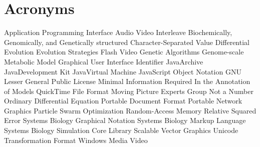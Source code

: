\chapter{Acronyms}
\begin{acronym}[SBSCL]
  \setlength{\parskip}{0ex}
  \setlength{\itemsep}{0.25ex}
        {Application Programming Interface}
        {Audio Video Interleave}
       {Biochemically, Genomically, and Genetically structured}
        {Character-Separated Value}
         {Differential Evolution}
         {Evolution Strategies}
        {Flash Video}
         {Genetic Algorithms}
        {Genome-scale Metabolic Model}
        {Graphical User Interface}
         {Identifier}
        {Java\TTra Archive}
        {Java\TTra Development Kit}
        {Java\TTra Virtual Machine}
       {JavaScript Object Notation}
       {GNU Lesser General Public License}
     {Minimal Information Required In the Annotation of Models}
        {QuickTime File Format}
        {Moving Picture Experts Group}
        {Not a Number}
        {Ordinary Differential Equation}
        {Portable Document Format}
        {Portable Network Graphics}
        {Particle Swarm Optimization}
        {Random-Access Memory}
        {Relative Squared Error}
       {Systems Biology Graphical Notation}
       {Systems Biology Markup Language}
      {Systems Biology Simulation Core Library}
        {Scalable Vector Graphics}
        {Unicode Transformation Format}
        {Windows Media Video}
\end{acronym}

